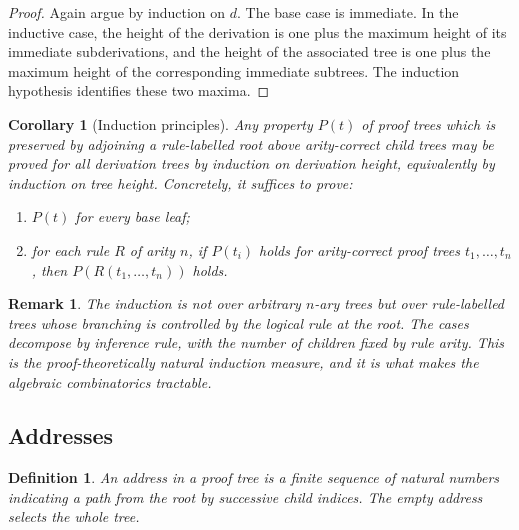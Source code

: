 \documentclass[11pt]{article}
\newtheorem{corollary}[theorem]{Corollary}
\newtheorem{definition}[theorem]{Definition}
\newtheorem{remark}[theorem]{Remark}
\begin{document}
\begin{proof}
Again argue by induction on \(d\). The base case is immediate. In the inductive
case, the height of the derivation is one plus the maximum height of its
immediate subderivations, and the height of the associated tree is one plus the
maximum height of the corresponding immediate subtrees. The induction
hypothesis identifies these two maxima.
\end{proof}

\begin{corollary}[Induction principles]
Any property \(P(t)\) of proof trees which is preserved by adjoining a
rule-labelled root above arity-correct child trees may be proved for all
derivation trees by induction on derivation height, equivalently by induction
on tree height. Concretely, it suffices to prove:
\begin{enumerate}[label=\textup{(\roman*)}]
\item \(P(t)\) for every base leaf;
\item for each rule \(R\) of arity \(n\), if \(P(t_i)\) holds for
arity-correct proof trees \(t_1,\ldots,t_n\), then \(P(R(t_1,\ldots,t_n))\)
holds.
\end{enumerate}
\end{corollary}

\begin{remark}
The induction is not over arbitrary \(n\)-ary trees but over rule-labelled
trees whose branching is controlled by the logical rule at the root.
The cases decompose by inference rule, with the number of children fixed
by rule arity. This is the proof-theoretically natural induction measure,
and it is what makes the algebraic combinatorics tractable.
\end{remark}

\subsection{Addresses}

\begin{definition}
An \emph{address} in a proof tree is a finite sequence of natural numbers
indicating a path from the root by successive child indices. The empty address
selects the whole tree.
\end{definition}
\end{document}
